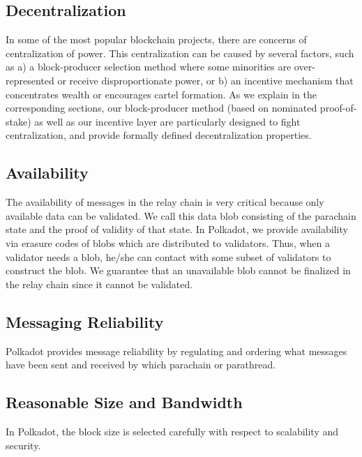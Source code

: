 \subsection{Decentralization}

In some of the most popular blockchain projects, there are concerns of centralization of power. 
This centralization can be caused by several factors, such as 
a) a block-producer selection method where some minorities are over-represented or receive disproportionate power, or
b) an incentive mechanism that concentrates wealth or encourages cartel formation.
As we explain in the corresponding sections, our block-producer method (based on nominated proof-of-stake) 
as well as our incentive layer are particularly designed to fight centralization, 
and provide formally defined decentralization properties.


 \subsection{Availability}
The availability of messages in the relay chain is very critical because only available data can be validated. We call this data blob consisting of the parachain state and the proof of validity of that state. In Polkadot, we provide availability via erasure codes of blobs which are distributed to validators. Thus, when a validator needs a blob, he/she can contact with some subset of validators to construct the blob. We guarantee that an unavailable blob cannot be finalized in the relay chain since it cannot be validated.



\subsection{Messaging Reliability} Polkadot provides message reliability by regulating and ordering what messages have been sent and received by which parachain or parathread. 

\subsection{Reasonable Size and Bandwidth} In Polkadot, the block size is selected carefully with respect to scalability and security.  


